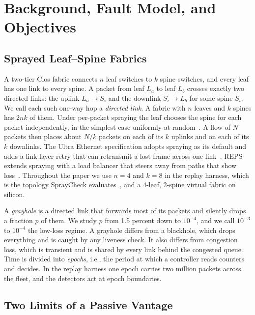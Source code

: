 \section{Background, Fault Model, and Objectives}
\label{sec:background}

\subsection{Sprayed Leaf--Spine Fabrics}

A two-tier Clos fabric connects $n$ leaf switches to $k$ spine switches, and every leaf has one link to every spine. A packet from leaf $L_a$ to leaf $L_b$ crosses exactly two directed links: the uplink $L_a\!\rightarrow\!S_i$ and the downlink $S_i\!\rightarrow\!L_b$ for some spine $S_i$. We call each such one-way hop a \emph{directed link}. A fabric with $n$ leaves and $k$ spines has $2nk$ of them. Under per-packet spraying the leaf chooses the spine for each packet independently, in the simplest case uniformly at random~\cite{spraying}. A flow of $N$ packets then places about $N/k$ packets on each of its $k$ uplinks and on each of its $k$ downlinks. The Ultra Ethernet specification adopts spraying as its default and adds a link-layer retry that can retransmit a lost frame across one link~\cite{uec}. REPS extends spraying with a load balancer that steers away from paths that show loss~\cite{reps}. Throughout the paper we use $n=4$ and $k=8$ in the replay harness, which is the topology SprayCheck evaluates~\cite{spraycheck}, and a 4-leaf, 2-spine virtual fabric on silicon.

A \emph{grayhole} is a directed link that forwards most of its packets and silently drops a fraction $p$ of them. We study $p$ from 1.5 percent down to $10^{-4}$, and we call $10^{-3}$ to $10^{-4}$ the low-loss regime. A grayhole differs from a blackhole, which drops everything and is caught by any liveness check. It also differs from congestion loss, which is transient and is shared by every link behind the congested queue. Time is divided into \emph{epochs}, i.e., the period at which a controller reads counters and decides. In the replay harness one epoch carries two million packets across the fleet, and the detectors act at epoch boundaries.

\subsection{Two Limits of a Passive Vantage}
\label{sec:limits}

